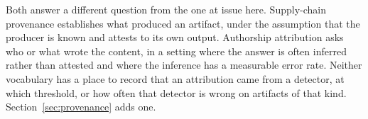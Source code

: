 Both answer a different question from the one at issue here. Supply-chain provenance
establishes what produced an artifact, under the assumption that the producer is known
and attests to its own output. Authorship attribution asks who or what wrote the
content, in a setting where the answer is often inferred rather than attested and where
the inference has a measurable error rate. Neither vocabulary has a place to record that
an attribution came from a detector, at which threshold, or how often that detector is
wrong on artifacts of that kind. Section~\ref{sec:provenance} adds one.
